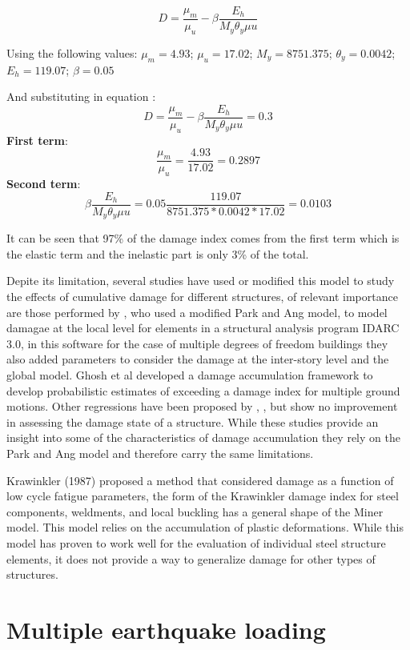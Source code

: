 \begin{equation}
	D=\frac{\mu_{m}}{\mu_{u}}-\beta\frac{E_h}{M_{y}\theta_y\mu{u}}
	\label{eq.DamageIndexGhosh}
\end{equation}

Using the following values: $\mu_{m}=4.93$; $\mu_{u}=17.02$; $M_{y}=8751.375$; $\theta_y=0.0042$; $E_{h}=119.07$; $\beta=0.05$ 

And substituting in equation :
\[
 D=\frac{\mu_{m}}{\mu_{u}}-\beta\frac{E_h}{M_{y}\theta_y\mu{u}}=0.3
	\]
\textbf{First term}:
\[
\frac{\mu_{m}}{\mu_{u}}=\frac{4.93}{17.02}=0.2897
\]
\textbf{Second term}: 
\[	
	\beta \frac{E_h}{M_{y}\theta_y\mu{u}}=0.05\frac{119.07}{8751.375*0.0042*17.02}=0.0103
\]

It can be seen that 97\% of the damage index comes from the first term which is the elastic term and the inelastic part is only 3\% of the total. 

Depite its limitation, several studies have used or modified this model to study the effects of cumulative damage for different structures,  of relevant importance are those performed by \cite{Kunnath1992}, who used a modified Park and Ang model, to model damagae at the local level for elements in a structural analysis program IDARC 3.0, in this software for the case of multiple degrees of freedom buildings they also added parameters to consider the damage at the inter-story level and the global model. Ghosh et al \cite{Ghosh2015} developed a damage accumulation framework to develop probabilistic estimates of exceeding a damage index for multiple ground motions. Other regressions have been proposed by \cite{Khashaee}, \cite{Fajfar1992}, \cite{Roufaiel} but show no improvement in assessing the damage state of a structure. While these studies provide an insight into some of the characteristics of damage accumulation they rely on the Park and Ang model and therefore carry the same limitations.

Krawinkler (1987) \cite{Krawinkler1987} proposed a method that considered damage as a function of low cycle fatigue parameters, the form of the Krawinkler damage index for steel components, weldments, and local buckling has a general shape of the Miner model. This model relies on the accumulation of plastic deformations. While this model has proven to work well for the evaluation of individual steel structure elements, it does not provide a way to generalize damage for other types of structures.


\section{Multiple earthquake loading}

